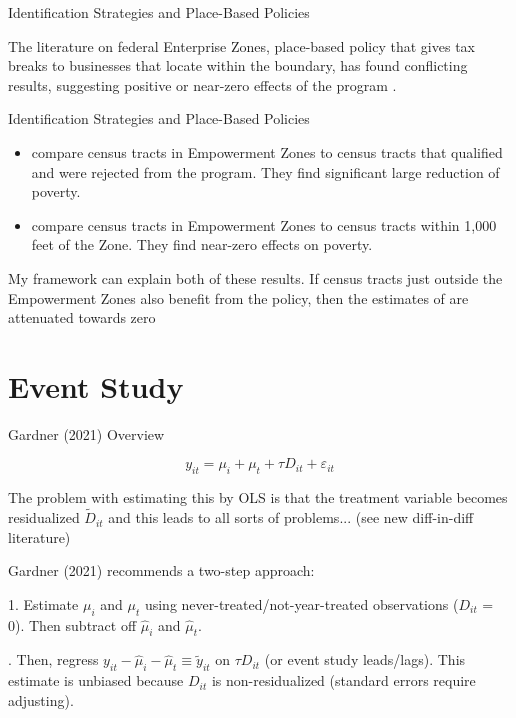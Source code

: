 \documentclass[aspectratio=169]{beamer}
\begin{document}
\begin{frame}{Identification Strategies and Place-Based Policies}

    The literature on federal Enterprise Zones, place-based policy that gives tax breaks to businesses that locate within the boundary, has found conflicting results, suggesting positive or near-zero effects of the program \citep{Neumark_Young_2019}. 


\end{frame}

\begin{frame}{Identification Strategies and Place-Based Policies}
    
    \begin{itemize}
        \item \citet{Busso_Gregory_Kline_2013} compare census tracts in Empowerment Zones to census tracts that qualified and were rejected from the program. They find significant large reduction of poverty.
        
        \pause
        \item \citet{Neumark_Kolko_2010} compare census tracts in Empowerment Zones to census tracts within 1,000 feet of the Zone. They find near-zero effects on poverty.
    \end{itemize}

    \pause
    My framework can explain both of these results. If census tracts just outside the Empowerment Zones also benefit from the policy, then the estimates of \citet{Neumark_Kolko_2010} are attenuated towards zero

\end{frame}

\section{Event Study}

\begin{frame}{Gardner (2021) Overview}

    \[ 
        y_{it} = \mu_i + \mu_t + \tau D_{it} + \varepsilon_{it}
    \]

    The problem with estimating this by OLS is that the treatment variable becomes residualized $\tilde{D}_{it}$ and this leads to all sorts of problems... (see new diff-in-diff literature)

    \pause

    Gardner (2021) recommends a two-step approach:

    1. Estimate $\mu_i$ and $\mu_t$ using never-treated/not-year-treated observations ($D_{it}$ = 0). Then subtract off $\hat{\mu}_i$ and $\hat{\mu}_t$.
        
    . Then, regress $y_{it} - \hat{\mu}_i - \hat{\mu}_t \equiv \tilde{y}_{it}$ on $\tau D_{it}$ (or event study leads/lags). This estimate is unbiased because $D_{it}$ is non-residualized (standard errors require adjusting).
\end{frame}
\end{document}

